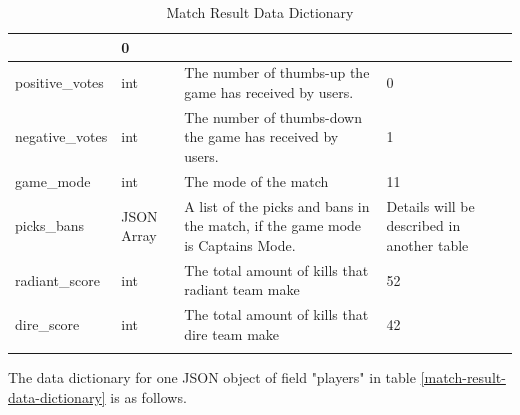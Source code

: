 \documentclass{article}
\begin{document}
\begin{longtable}{|p{3cm}|p{2cm}|p{5cm}|p{3cm}|}
  & 0 \\
\hline
positive\_votes  & int  & The number of thumbs-up the game has received by users.  & 0 \\
\hline
negative\_votes  & int  & The number of thumbs-down the game has received by users.  & 1 \\
\hline
game\_mode  & int  & The mode of the match  & 11 \\
\hline
picks\_bans  & JSON Array  & A list of the picks and bans in the match, if the game mode is Captains Mode.  & Details will be described in another table \\
\hline
radiant\_score  & int  & The total amount of kills that radiant team make  & 52 \\
\hline
dire\_score  & int  & The total amount of kills that dire team make  & 42 \\
\hline
\caption{Match Result Data Dictionary}
\end{longtable}
\label{match-result-data-dictionary}


The data dictionary for one JSON object of field "players" in table \ref{match-result-data-dictionary} is as follows.
\end{document}
